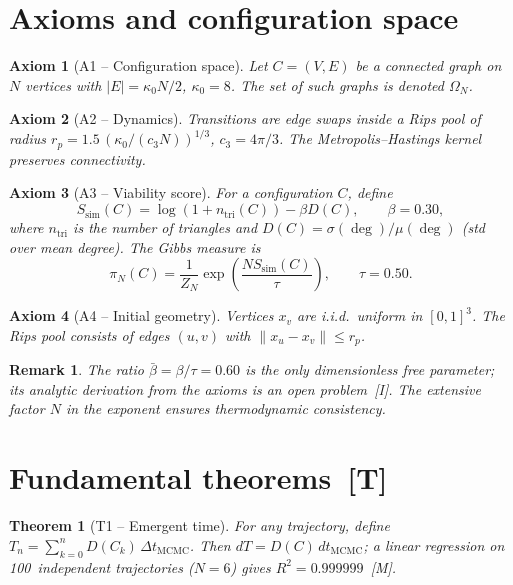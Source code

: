 \documentclass[11pt, a4paper]{article}
\newtheorem{axiom}{Axiom}
\newtheorem{theorem}{Theorem}
\newtheorem{remark}{Remark}
\begin{document}
\section{Axioms and configuration space}

\begin{axiom}[A1 – Configuration space]
Let $C=(V,E)$ be a connected graph on $N$ vertices with
$|E|=\kappa_0 N/2$, $\kappa_0=8$.
The set of such graphs is denoted $\Omega_N$.
\end{axiom}

\begin{axiom}[A2 – Dynamics]
Transitions are edge swaps inside a Rips pool of radius
$r_p=1.5\,(\kappa_0/(c_3 N))^{1/3}$, $c_3=4\pi/3$.
The Metropolis–Hastings kernel preserves connectivity.
\end{axiom}

\begin{axiom}[A3 – Viability score]
For a configuration $C$, define
\[
  S_{\text{sim}}(C) = \log(1+n_{\text{tri}}(C)) - \beta D(C),
  \qquad \beta=0.30,
\]
where $n_{\text{tri}}$ is the number of triangles and
$D(C)=\sigma(\deg)/\mu(\deg)$ (std over mean degree).
The Gibbs measure is
\[
  \pi_N(C) = \frac{1}{Z_N}
  \exp\!\left(\frac{N S_{\text{sim}}(C)}{\tau}\right),
  \qquad \tau=0.50.
\]
\end{axiom}

\begin{axiom}[A4 – Initial geometry]
Vertices $x_v$ are i.i.d.\ uniform in $[0,1]^3$.
The Rips pool consists of edges $(u,v)$ with $\|x_u-x_v\|\le r_p$.
\end{axiom}

\begin{remark}
The ratio $\bar\beta=\beta/\tau=0.60$ is the only dimensionless
free parameter; its analytic derivation from the axioms is an
open problem~[I].
The extensive factor $N$ in the exponent ensures thermodynamic
consistency.
\end{remark}

\section{Fundamental theorems~[T]}

\begin{theorem}[T1 – Emergent time]
For any trajectory, define
$T_n=\sum_{k=0}^{n}D(C_k)\,\Delta t_{\text{MCMC}}$.
Then $dT=D(C)\,dt_{\text{MCMC}}$; a linear regression on
100~independent trajectories ($N=6$) gives $R^2=0.999999$~[M].
\end{theorem}
\end{document}
